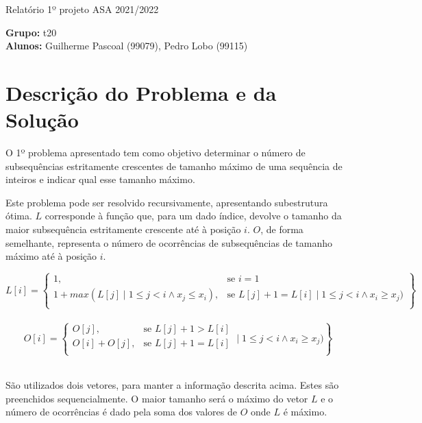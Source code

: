 \documentclass[12pt, letterpaper]{article}
\begin{document}
\begin{center}
	{\LARGE{Relatório 1º projeto ASA 2021/2022}}\\[\baselineskip]
\end{center}

\begin{flushleft}
	\textbf{Grupo:} t20\\
	\textbf{Alunos:} Guilherme Pascoal (99079), Pedro Lobo (99115)
\end{flushleft}


\section{Descrição do Problema e da Solução}

O 1º problema apresentado tem como objetivo determinar o número de subsequências
estritamente crescentes de tamanho máximo de uma sequência de inteiros e indicar
qual esse tamanho máximo.

Este problema pode ser resolvido recursivamente, apresentando subestrutura ótima.
$L$ corresponde à função que, para um dado índice, devolve o tamanho da maior
subsequência estritamente crescente até à posição $i$. $O$, de forma semelhante,
representa o número de ocorrências de subsequências de tamanho máximo até à
posição $i$.

\begin{center}
	\[
    L[i] = \left\{\begin{array}{lr}
		1, & \text{se } i = 1\\
		{1 + max(L[j] \mid 1 \leq j < i \land x_j \leq x_i)}, & \text{se } L[j] + 1 = L[i] \mid 1 \leq j < i \land x_i \geq x_j)\\
	\end{array}\right\}
	\]\\[\baselineskip]

	\[
    O[i] = \left\{\begin{array}{lr}
		O[j], & \text{se } L[j] + 1 > L[i]\\
		O[i] + O[j], & \text{se } L[j] + 1 = L[i]\\
        \end{array} \mid 1 \leq j < i \land x_i \geq x_j)\right\}
	\]\\[\baselineskip]

\end{center}

São utilizados dois vetores, para manter a informação descrita acima. Estes são
preenchidos sequencialmente. O maior tamanho será o máximo do vetor $L$ e o
número de ocorrências é dado pela soma dos valores de $O$ onde $L$ é máximo.\\[\baselineskip]
\end{document}
